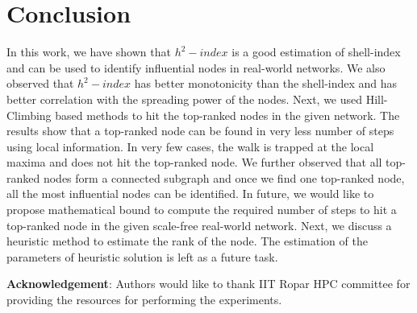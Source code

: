 \documentclass[12pt,3p]{article}
\begin{document}
\begin{table}[htp]
\centering
\caption{Results for Rank Estimation using Best-fit Curve}
\label{tablerank}
\end{table}

\section{Conclusion}\label{conclusion}

In this work, we have shown that $h^2-index$ is a good estimation of shell-index and can be used to identify influential nodes in real-world networks. 
We also observed that $h^2-index$ has better monotonicity than the shell-index and has better correlation with the spreading power of the nodes.
Next, we used Hill-Climbing based methods to hit the top-ranked nodes in the given network. The results show that a top-ranked node can be found in very less number of steps using local information. In very few cases, the walk is trapped at the local maxima and does not hit the top-ranked node. We further observed that all top-ranked nodes form a connected subgraph and once we find one top-ranked node, all the most influential nodes can be identified. In future, we would like to propose mathematical bound to compute the required number of steps to hit a top-ranked node in the given scale-free real-world network. Next, we discuss a heuristic method to estimate the rank of the node. The estimation of the parameters of heuristic solution is left as a future task.


\textbf{Acknowledgement}: Authors would like to thank IIT Ropar HPC committee for providing the resources for performing the experiments. 




\end{document}

